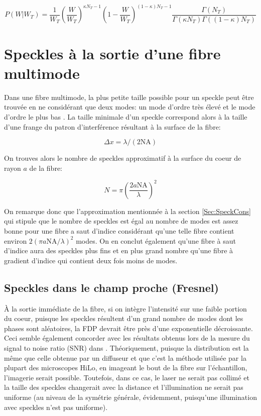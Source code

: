 \documentclass{article}       %
\begin{document}
\begin{equation}
    P(W|W_T) = \frac{1}{W_T}\left(\frac{W}{W_T}\right)^{\kappa N_{T}-1}\left(1-\frac{W}{W_T}\right)^{(1-\kappa)N_{T}-1}\frac{\Gamma(N_{T})}{\Gamma(\kappa N_{T})\Gamma((1-\kappa)N_{T})}
\end{equation}

\bigskip
\bigskip

\section{Speckles à la sortie d'une fibre multimode}

Dans une fibre multimode, la plus petite taille possible pour un speckle peut être trouvée en ne considérant que deux modes: un mode d'ordre très élevé et le mode d'ordre le plus bas \cite{FiberStats}. La taille minimale d'un speckle correspond alors à la taille d'une frange du patron d'interférence résultant à la surface de la fibre:

\begin{equation}
    \Delta x = \lambda/(2\text{NA})
\end{equation}

On trouves alors le nombre de speckles approximatif à la surface du coeur de rayon $a$ de la fibre:

\begin{equation}
    N = \pi\left(\frac{2a\text{NA}}{\lambda}\right)^2
\end{equation}

On remarque donc que l'approximation mentionnée à la section \ref{Sec:SpeckCons} qui stipule que le nombre de speckles est égal au nombre de modes est assez bonne pour une fibre a saut d'indice considérant qu'une telle fibre contient environ $2(\pi a\text{NA}/\lambda)^2$ modes. On en conclut également qu'une fibre à saut d'indice aura des speckles plus fins et en plus grand nombre qu'une fibre à gradient d'indice qui contient deux fois moins de modes.


\subsection{Speckles dans le champ proche (Fresnel)}

À la sortie immédiate de la fibre, si on intègre l'intensité sur une faible portion du coeur, puisque les speckles résultent d'un grand nombre de modes dont les phases sont aléatoires, la FDP devrait être près d'une exponentielle décroissante. Ceci semble également concorder avec les résultats obtenus lors de la mesure du signal to noise ratio (SNR) dans \cite{Constrained}. Théoriquement, puisque la distribution est la même que celle obtenue par un diffuseur et que c'est la méthode utilisée par la plupart des microscopes HiLo, en imageant le bout de la fibre sur l'échantillon, l'imagerie serait possible. Toutefois, dans ce cas, le laser ne serait pas collimé et la taille des speckles changerait avec la distance et l'illumination ne serait pas uniforme (au niveau de la symétrie générale, évidemment, puisqu'une illumination avec speckles n'est pas uniforme).
\end{document}
